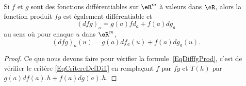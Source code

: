 \begin{lemma}		\label{LemDiffProsuid}
	Si $f$ et $g$ sont des fonctions différentiables sur $\eR^m$ à valeurs dans $\eR$, alors la fonction produit $fg$ est également différentiable et
	\begin{equation}		\label{EqDifffgProd}
		(dfg)_a=g(a)fd_a+f(a)dg_a
	\end{equation}
	au sens où pour chaque $u$ dans $\eR^m$,
	\begin{equation}
		(dfg)_a(u)=g(a)df_a(u)+f(a)dg_a(u).
	\end{equation}
\end{lemma}

\begin{proof}
	Ce que nous devons faire pour vérifier la formule~\ref{EqDifffgProd}, c'est de vérifier le critère \eqref{EqCritereDefDiff} en remplaçant $f$ par $fg$ et $T(h)$ par $g(a)df(a).h+f(a)dg(a).h$.


\end{proof}
